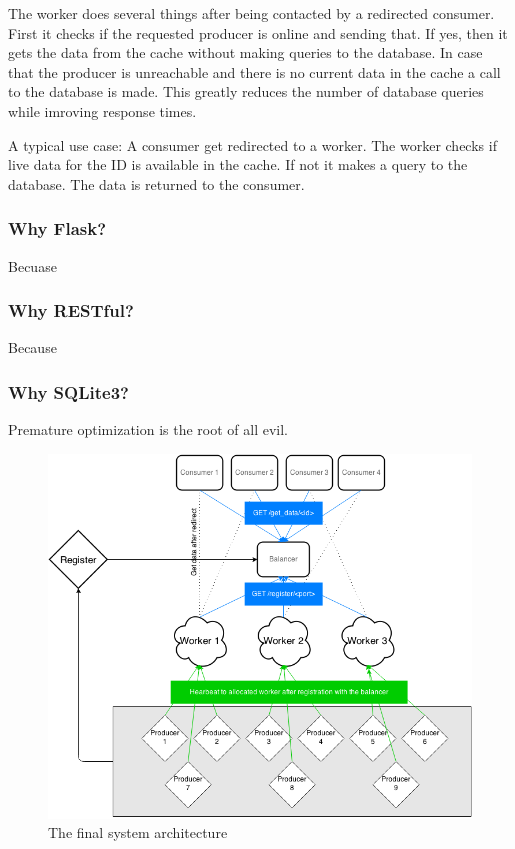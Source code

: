 \documentclass{sigchi}
\begin{document}
The worker does several things after being contacted by a redirected consumer. First it checks if the requested producer is online and sending that. If yes, then it gets the data from the cache without making queries to the database. In case that the producer is unreachable and there is no current data in the cache a call to the database is made. This greatly reduces the number of database queries while imroving response times.

A typical use case:
A consumer get redirected to a worker. The worker checks if live data for the ID is available in the cache. If not it makes a query to the database. The data is returned to the consumer.


\subsubsection{Why Flask?}
Becuase

\subsubsection{Why RESTful?}

Because

\subsubsection{Why SQLite3?}

Premature optimization is the root of all evil.

\begin{figure}[!h]
\centering
\includegraphics[width=0.9\columnwidth]{img/main}
\caption{The final system architecture}
\label{fig:main}
\end{figure}
\end{document}
